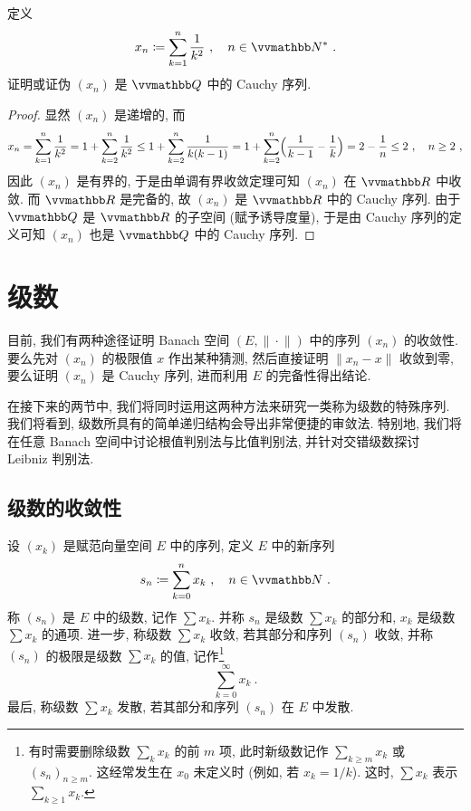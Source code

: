 \begin{exercise}
    定义
    \[
        x_n \coloneqq \sum_{k = 1}^n \frac{1}{k^2}\ ,\quad n \in \N^\ast\ .
    \]
    证明或证伪 \((x_n)\) 是 \(\Q\) 中的 Cauchy 序列.
\end{exercise}

\begin{proof}
    显然 \((x_n)\) 是递增的, 而
    \[
        x_n = \sum_{k = 1}^n \frac{1}{k^2} = 1 + \sum_{k = 2}^n \frac{1}{k^2} \leq 1 + \sum_{k = 2}^n \frac{1}{k (k - 1)} = 1 + \sum_{k = 2}^n \Bigl(\frac{1}{k - 1} - \frac{1}{k}\Bigr) = 2 - \frac{1}{n} \leq 2\ ,\quad n \geq 2\ ,
    \]
    因此 \((x_n)\) 是有界的, 于是由单调有界收敛定理可知 \((x_n)\) 在 \(\R\) 中收敛. 而 \(\R\) 是完备的, 故 \((x_n)\) 是 \(\R\) 中的 Cauchy 序列. 由于 \(\Q\) 是 \(\R\) 的子空间 (赋予诱导度量), 于是由 Cauchy 序列的定义可知 \((x_n)\) 也是 \(\Q\) 中的 Cauchy 序列.
\end{proof}

\newpage

\section{级数}

目前, 我们有两种途径证明 Banach 空间 \((E, \|\!\cdot\!\|)\) 中的序列 \((x_n)\) 的收敛性. 要么先对 \((x_n)\) 的极限值 \(x\) 作出某种猜测, 然后直接证明 \(\|x_n - x\|\) 收敛到零, 要么证明 \((x_n)\) 是 Cauchy 序列, 进而利用 \(E\) 的完备性得出结论.

在接下来的两节中, 我们将同时运用这两种方法来研究一类称为级数的特殊序列. 我们将看到, 级数所具有的简单递归结构会导出非常便捷的审敛法. 特别地, 我们将在任意 Banach 空间中讨论根值判别法与比值判别法, 并针对交错级数探讨 Leibniz 判别法.

\subsection{级数的收敛性}

\begin{definition}[级数]
    设 \((x_k)\) 是赋范向量空间 \(E\) 中的序列, 定义 \(E\) 中的新序列
    \[
        s_n \coloneqq \sum_{k = 0}^n x_k\ ,\quad n \in \N\ .
    \]
    称 \((s_n)\) 是 \(E\) 中的级数, 记作 \(\sum x_k\). 并称 \(s_n\) 是级数 \(\sum x_k\) 的部分和, \(x_k\) 是级数 \(\sum x_k\) 的通项. 进一步, 称级数 \(\sum x_k\) 收敛, 若其部分和序列 \((s_n)\) 收敛, 并称 \((s_n)\) 的极限是级数 \(\sum x_k\) 的值, 记作\footnote{有时需要删除级数 \(\sum_k x_k\) 的前 \(m\) 项, 此时新级数记作 \(\sum_{k \geq m} x_k\) 或 \((s_n)_{n \geq m}\). 这经常发生在 \(x_0\) 未定义时 (例如, 若 \(x_k = 1 / k\)). 这时, \(\sum x_k\) 表示 \(\sum_{k \geq 1} x_k\).}
    \[
        \sum_{k = 0}^\infty x_k\ .
    \]
    最后, 称级数 \(\sum x_k\) 发散, 若其部分和序列 \((s_n)\) 在 \(E\) 中发散.
\end{definition}

